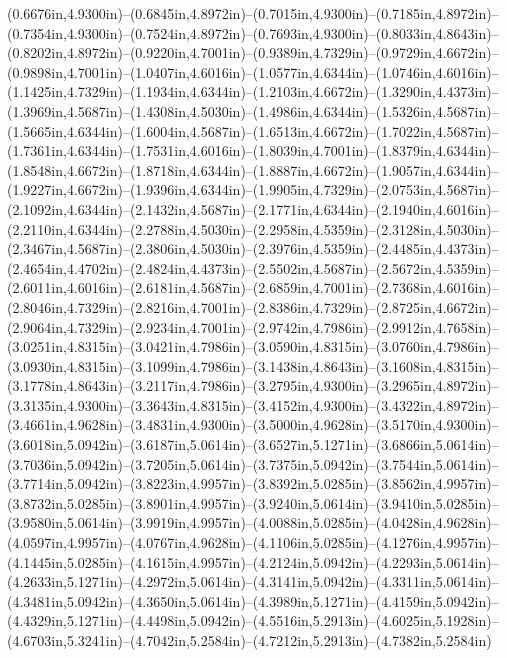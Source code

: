 (0.6676in,4.9300in)--(0.6845in,4.8972in)--(0.7015in,4.9300in)--(0.7185in,4.8972in)--(0.7354in,4.9300in)--(0.7524in,4.8972in)--(0.7693in,4.9300in)--(0.8033in,4.8643in)--(0.8202in,4.8972in)--(0.9220in,4.7001in)--(0.9389in,4.7329in)--(0.9729in,4.6672in)--(0.9898in,4.7001in)--(1.0407in,4.6016in)--(1.0577in,4.6344in)--(1.0746in,4.6016in)--(1.1425in,4.7329in)--(1.1934in,4.6344in)--(1.2103in,4.6672in)--(1.3290in,4.4373in)--(1.3969in,4.5687in)--(1.4308in,4.5030in)--(1.4986in,4.6344in)--(1.5326in,4.5687in)--(1.5665in,4.6344in)--(1.6004in,4.5687in)--(1.6513in,4.6672in)--(1.7022in,4.5687in)--(1.7361in,4.6344in)--(1.7531in,4.6016in)--(1.8039in,4.7001in)--(1.8379in,4.6344in)--(1.8548in,4.6672in)--(1.8718in,4.6344in)--(1.8887in,4.6672in)--(1.9057in,4.6344in)--(1.9227in,4.6672in)--(1.9396in,4.6344in)--(1.9905in,4.7329in)--(2.0753in,4.5687in)--(2.1092in,4.6344in)--(2.1432in,4.5687in)--(2.1771in,4.6344in)--(2.1940in,4.6016in)--(2.2110in,4.6344in)--(2.2788in,4.5030in)--(2.2958in,4.5359in)--(2.3128in,4.5030in)--(2.3467in,4.5687in)--(2.3806in,4.5030in)--(2.3976in,4.5359in)--(2.4485in,4.4373in)--(2.4654in,4.4702in)--(2.4824in,4.4373in)--(2.5502in,4.5687in)--(2.5672in,4.5359in)--(2.6011in,4.6016in)--(2.6181in,4.5687in)--(2.6859in,4.7001in)--(2.7368in,4.6016in)--(2.8046in,4.7329in)--(2.8216in,4.7001in)--(2.8386in,4.7329in)--(2.8725in,4.6672in)--(2.9064in,4.7329in)--(2.9234in,4.7001in)--(2.9742in,4.7986in)--(2.9912in,4.7658in)--(3.0251in,4.8315in)--(3.0421in,4.7986in)--(3.0590in,4.8315in)--(3.0760in,4.7986in)--(3.0930in,4.8315in)--(3.1099in,4.7986in)--(3.1438in,4.8643in)--(3.1608in,4.8315in)--(3.1778in,4.8643in)--(3.2117in,4.7986in)--(3.2795in,4.9300in)--(3.2965in,4.8972in)--(3.3135in,4.9300in)--(3.3643in,4.8315in)--(3.4152in,4.9300in)--(3.4322in,4.8972in)--(3.4661in,4.9628in)--(3.4831in,4.9300in)--(3.5000in,4.9628in)--(3.5170in,4.9300in)--(3.6018in,5.0942in)--(3.6187in,5.0614in)--(3.6527in,5.1271in)--(3.6866in,5.0614in)--(3.7036in,5.0942in)--(3.7205in,5.0614in)--(3.7375in,5.0942in)--(3.7544in,5.0614in)--(3.7714in,5.0942in)--(3.8223in,4.9957in)--(3.8392in,5.0285in)--(3.8562in,4.9957in)--(3.8732in,5.0285in)--(3.8901in,4.9957in)--(3.9240in,5.0614in)--(3.9410in,5.0285in)--(3.9580in,5.0614in)--(3.9919in,4.9957in)--(4.0088in,5.0285in)--(4.0428in,4.9628in)--(4.0597in,4.9957in)--(4.0767in,4.9628in)--(4.1106in,5.0285in)--(4.1276in,4.9957in)--(4.1445in,5.0285in)--(4.1615in,4.9957in)--(4.2124in,5.0942in)--(4.2293in,5.0614in)--(4.2633in,5.1271in)--(4.2972in,5.0614in)--(4.3141in,5.0942in)--(4.3311in,5.0614in)--(4.3481in,5.0942in)--(4.3650in,5.0614in)--(4.3989in,5.1271in)--(4.4159in,5.0942in)--(4.4329in,5.1271in)--(4.4498in,5.0942in)--(4.5516in,5.2913in)--(4.6025in,5.1928in)--(4.6703in,5.3241in)--(4.7042in,5.2584in)--(4.7212in,5.2913in)--(4.7382in,5.2584in)
